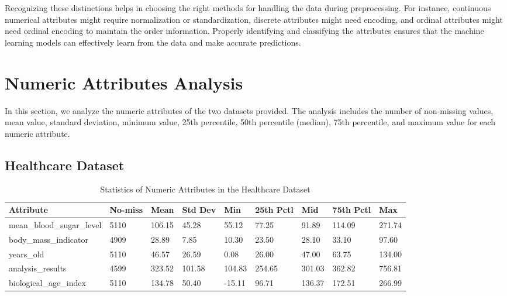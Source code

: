 \documentclass[a4paper,12pt]{article}
\begin{document}
Recognizing these distinctions helps in choosing the right methods for handling the data during preprocessing. For instance, continuous numerical attributes might require normalization or standardization, discrete attributes might need encoding, and ordinal attributes might need ordinal encoding to maintain the order information. Properly identifying and classifying the attributes ensures that the machine learning models can effectively learn from the data and make accurate predictions.

\section{Numeric Attributes Analysis}

In this section, we analyze the numeric attributes of the two datasets provided. The analysis includes the number of non-missing values, mean value, standard deviation, minimum value, 25th percentile, 50th percentile (median), 75th percentile, and maximum value for each numeric attribute.

\subsection{Healthcare Dataset}

\begin{table}[h!]
\centering
\caption{Statistics of Numeric Attributes in the Healthcare Dataset}
\vspace{0.5cm}
\small
\begin{tabularx}{\textwidth}{|l|X|X|X|X|X|X|X|X|}
\hline
\textbf{Attribute} & \textbf{No-miss} & \textbf{Mean} & \textbf{Std Dev} & \textbf{Min} & \textbf{25th Pctl} & \textbf{Mid} & \textbf{75th Pctl} & \textbf{Max} \\
\hline
mean\_blood\_sugar\_level & 5110 & 106.15 & 45.28 & 55.12 & 77.25 & 91.89 & 114.09 & 271.74 \\
body\_mass\_indicator & 4909 & 28.89 & 7.85 & 10.30 & 23.50 & 28.10 & 33.10 & 97.60 \\
years\_old & 5110 & 46.57 & 26.59 & 0.08 & 26.00 & 47.00 & 63.75 & 134.00 \\
analysis\_results & 4599 & 323.52 & 101.58 & 104.83 & 254.65 & 301.03 & 362.82 & 756.81 \\
biological\_age\_index & 5110 & 134.78 & 50.40 & -15.11 & 96.71 & 136.37 & 172.51 & 266.99 \\
\hline
\end{tabularx}
\normalsize
\end{table}
\end{document}

